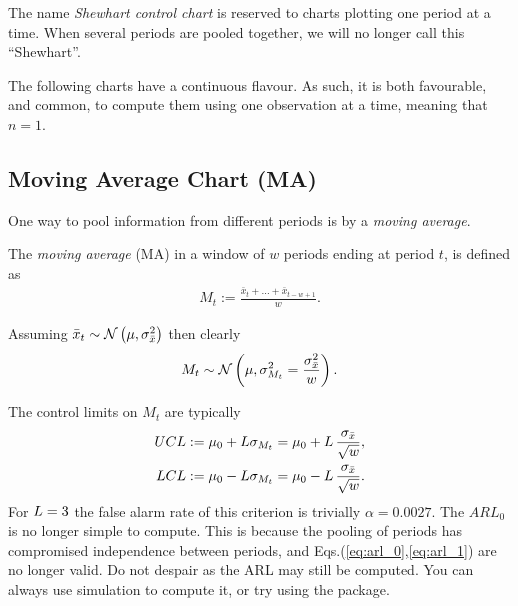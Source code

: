 \begin{remark}
The name \emph{Shewhart control chart} is reserved to charts plotting one period at a time. 
When several periods are pooled together, we will no longer call this  ``Shewhart''.
\end{remark}

\begin{remark}
The following charts have a continuous flavour. As such, it is both favourable, and common, to compute them using one observation at a time, meaning that $n=1$. 
\end{remark}





\subsection{Moving Average Chart (MA)}

One way to pool information from different periods is by a \emph{moving average}.
\begin{definition}[MA]
The \emph{moving average} (MA) in a window of $w$ periods ending at period $t$, is defined as
\begin{align}
	M_t:= \frac{\bar{x}_t+\dots+\bar{x}_{t-w+1}}{w}.
\end{align}
\end{definition}
Assuming $\bar{x}_t \sim \mathcal{N}\left(\mu, \sigma_{\bar{x}}^2\right)$ then clearly 
\begin{align}
	M_t \sim \mathcal{N}\left(\mu, \sigma^2_{M_t}=\frac{\sigma_{\bar{x}}^2}{w}\right).
\end{align}

The control limits on $M_t$ are typically
\begin{align}
	UCL &:= \mu_0 + L \sigma_{M_t}= \mu_0 + L \, \frac{\sigma_{\bar{x}}}{\sqrt{w}}, \\
	LCL &:= \mu_0 - L \sigma_{M_t}= \mu_0 - L \, \frac{\sigma_{\bar{x}}}{\sqrt{w}}.
\end{align}
For $L=3$ the false alarm rate of this criterion is trivially $\alpha=0.0027$. 
The $ARL_0$ is no longer simple to compute. 
This is because the pooling of periods has compromised independence between periods, and Eqs.(\ref{eq:arl_0},\ref{eq:arl_1}) are no longer valid. 
Do not despair as the ARL may still be computed. 
You can always use simulation to compute it, or try using the  \R package.




